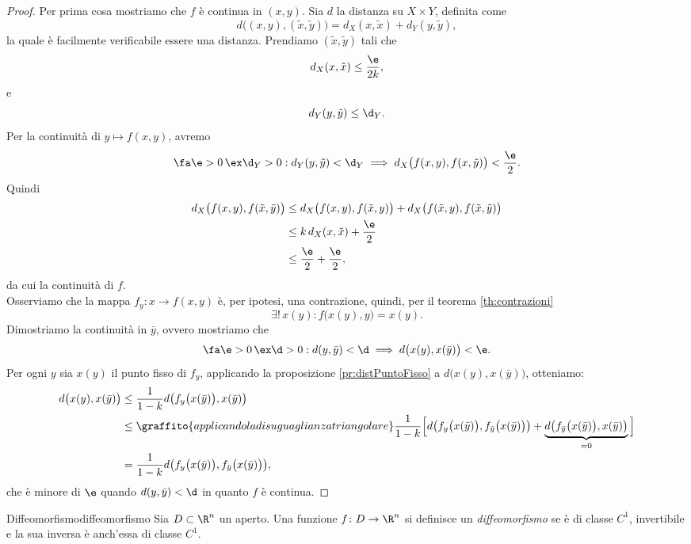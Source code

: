\begin{proof}
	Per prima cosa mostriamo che \(f\) è continua in \((x,y)\).
	Sia \(d\) la distanza su \(X\times Y\), definita come
	\[
		d\big((x,y),(\tilde{x},\tilde{y})\big)=d_X(x,\tilde{x})+d_Y(y,\tilde{y}),
	\]
	la quale è facilmente verificabile essere una distanza.
	Prendiamo \((\tilde{x},\tilde{y})\) tali che
	\[
		d_X(x,\tilde{x})\le\frac{\e}{2 k},
	\]
	e
	\[
		d_Y(y,\tilde{y})\le\d_Y.
	\]
	Per la continuità di \(y\mapsto f(x,y)\), avremo
	\[
		\fa \e>0\,\ex \d_Y>0:d_Y(y,\tilde{y})<\d_Y\implies d_X\big(f(x,y),f(x,\tilde{y})\big)<\frac{\e}{2}.
	\]
	Quindi
	\[
		\begin{split}
			d_X\big(f(x,y),f(\tilde{x},\tilde{y})\big) & \le d_X\big(f(x,y),f(\tilde{x},y)\big)+d_X\big(f(\tilde{x},y),f(\tilde{x},\tilde{y})\big)\\
			& \le k \,d_X(x,\tilde{x})+\frac{\e}{2}\\
			& \le \frac{\e}{2}+\frac{\e}{2},
		\end{split}
	\]
	da cui la continuità di \(f\).\\
	Osserviamo che la mappa \(f_y: x\to f(x,y)\) è, per ipotesi, una contrazione, quindi, per il teorema \ref{th:contrazioni}
	\[
		\exists!\,x(y):f\big(x(y),y\big)=x(y).
	\]
	Dimostriamo la continuità in \(\bar{y}\), ovvero mostriamo che
	\[
		\fa\e>0\,\ex\d>0:d(y,\bar{y})<\d\implies d\big(x(y),x(\bar{y})\big)<\e.
	\]
	Per ogni \(y\) sia \(x(y)\) il punto fisso di \(f_y\), applicando la proposizione \ref{pr:distPuntoFisso} a \(d\big(x(y),x(\bar{y})\big)\), otteniamo:
	\[
		\begin{split}
			d\big(x(y),x(\bar{y})\big) & \le\frac{1}{1-k}d\big(f_y\big(x(\bar{y})\big),x(\bar{y})\big)\\
			& \le\graffito{applicando la disuguaglianza triangolare}\frac{1}{1-k}\Big[d\big(f_y\big(x(\bar{y})\big),f_{\bar{y}}\big(x(\bar{y})\big)\big)+\underbrace{d\big(f_{\bar{y}}\big(x(\bar{y})\big),x(\bar{y})\big)}_{=0}\Big]\\
			& =\frac{1}{1-k}d\big(f_y\big(x(\bar{y})\big),f_{\bar{y}}\big(x(\bar{y})\big)\big),
		\end{split}
	\]
	che è minore di \(\e\) quando \(d(y,\bar{y})<\d\) in quanto \(f\) è continua.
\end{proof}

\begin{defn}{Diffeomorfismo}{diffeomorfismo}
	Sia \(D\subset\R^n\) un aperto.
	Una funzione \(f\colon D\to\R^n\) si definisce un \emph{diffeomorfismo} se è di classe \(C^1\), invertibile e la sua inversa è anch'essa di classe \(C^1\).
\end{defn}

